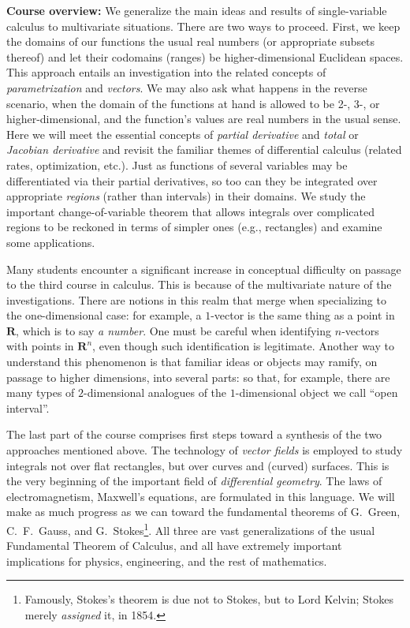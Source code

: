 \documentclass[10pt]{amsart}
\begin{document}
\textbf{Course overview:} We generalize the main ideas and results of single-variable calculus to multivariate situations. There are two ways to proceed. First, we keep the domains of our functions the usual real numbers (or appropriate subsets thereof) and let their codomains (ranges) be higher-dimensional Euclidean spaces. This approach entails an investigation into the related concepts of \emph{parametrization} and \emph{vectors}. We may also ask what happens in the reverse scenario, when the domain of the functions at hand is allowed to be 2-, 3-, or higher-dimensional, and the function's values are real numbers in the usual sense. Here we will meet the essential concepts of \emph{partial derivative} and \emph{total} or \emph{Jacobian derivative} and revisit the familiar themes of differential calculus (related rates, optimization, etc.). Just as functions of several variables may be differentiated via their partial derivatives, so too can they be integrated over appropriate \emph{regions} (rather than intervals) in their domains. We study the important change-of-variable theorem that allows integrals over complicated regions to be reckoned in terms of simpler ones (e.g., rectangles) and examine some applications.

Many students encounter a significant increase in conceptual difficulty on passage to the third course in calculus. This is because of the multivariate nature of the investigations. There are notions in this realm that merge when specializing to the one-dimensional case: for example, a $1$-vector is the same thing as a point in $\mathbf{R}$, which is to say \emph{a number}. One must be careful when identifying $n$-vectors with points in $\mathbf{R}^n$, even though such identification is  legitimate. Another way to understand this phenomenon is that familiar ideas or objects may ramify, on passage to higher dimensions, into several parts: so that, for example, there are many types of $2$-dimensional analogues of the $1$-dimensional object we call ``open interval''.

The last part of the course comprises first steps toward a synthesis of the two approaches mentioned above. The technology of \emph{vector fields} is employed to study integrals not over flat rectangles, but over curves and (curved) surfaces. This is the very beginning of the important field of \emph{differential geometry}. The laws of electromagnetism, Maxwell's equations, are formulated in this language. We will make as much progress as we can toward the fundamental theorems of G.\ Green, C.\ F.\ Gauss, and G.\ Stokes\footnote{Famously, Stokes's theorem is due not to Stokes, but to Lord Kelvin; Stokes merely \emph{assigned} it, in 1854.}. All three are vast generalizations of the usual Fundamental Theorem of Calculus, and all have extremely important implications for physics, engineering, and the rest of mathematics.
\end{document}
